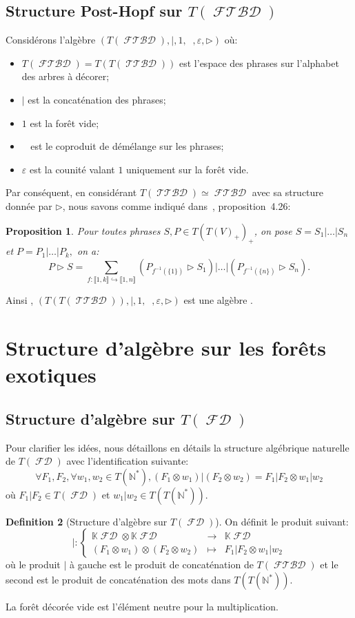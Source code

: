 \documentclass[french]{article}
\theoremstyle{definition}
\newtheorem{defi}{Definition}[section]
\theoremstyle{plain}
\newtheorem{Prop}[defi]{Proposition}
\newcommand{\IEM}[2]{\llbracket #1,#2 \rrbracket}
\newcommand{\e}{\varepsilon}
\newcommand{\K}{\mathbb{K}}
\newcommand{\N}{\mathbb{N}}
\DeclareMathOperator{\Dsh}{{\Delta_{\shuffle}}}
\DeclareMathOperator{\FTBD}{\mathcal{FTBD}}
\DeclareMathOperator{\TTBD}{\mathcal{TTBD}}
\DeclareMathOperator{\FD}{\mathcal{FD}}
\begin{document}
\subsection{Structure Post-Hopf sur $T(\FTBD)$}


Considérons l'algèbre \PH{} $\left( T(\FTBD), |, 1, \Dsh, \e, \rhd \right)$ où:
\begin{itemize}
	\item $T(\FTBD)=T(T(\TTBD))$ est l'espace des phrases sur l'alphabet des arbres à décorer;
	\item $|$ est la concaténation des phrases;
	\item $1$ est la forêt vide;
	\item $\Dsh$ est le coproduit de démélange sur les phrases;
	\item $\e$ est la counité valant $1$ uniquement sur la forêt vide.
\end{itemize}
Par conséquent, en considérant $T(\TTBD)\simeq\FTBD$ avec sa structure \PL{} donnée par $\rhd$, nous savons comme indiqué dans~\cite{Cat24CQMM}, proposition~4.26:

\begin{Prop}\label{Prop:PL_assoprod}
	Pour toutes phrases $S,P\in T\left(T(V)_+\right)_+$,  on pose $S=S_1|\dots|S_n$ et $P=P_1|\dots|P_k,$ on a:
	\[
	P\rhd S=\sum_{f:\IEM{1}{k}\hookrightarrow \IEM{1}{n}} \left(P_{f^{-1}(\{1\})}\rhd S_1\right)|\dots |\left( P_{f^{-1}(\{n\})}\rhd S_n\right).
	\]
\end{Prop}

Ainsi , $\left( T(T(\TTBD)), |, 1 , \Dsh, \e, \rhd \right)$ est une algèbre \PH{}.

\section{Structure d'algèbre \PH{} sur les forêts exotiques}

\subsection{Structure d'algèbre \PH{} sur $T(\FD)$}

Pour clarifier les idées, nous détaillons en détails la structure algébrique naturelle de $T(\FD)$ avec l'identification suivante:
\[
\forall F_1, F_2,\forall w_1,w_2\in T(\N^*), (F_1\otimes w_1)|(F_2\otimes w_2)=F_1|F_2\otimes w_1|w_2
\]
où $F_1|F_2\in T(\FD)$ et $w_1|w_2\in T(T(\N^*))$.

\begin{defi}[Structure d'algèbre sur $T(\FD)$]
	On définit le produit suivant:
	\[
	|:\left\lbrace\begin{array}{rcl}
		\K\FD\otimes \K\FD & \rightarrow & \K\FD \\
		(F_1\otimes w_1)\otimes (F_2\otimes w_2) & \mapsto & F_1| F_2 \otimes w_1 | w_2 
	\end{array} \right.
	\]
	où le produit $|$ à gauche est le produit de concaténation de $T(\FTBD)$ et le second est le produit de concaténation des mots dans $T(T(\N^*))$.
	
	La forêt décorée vide est l'élément neutre pour la multiplication.
\end{defi}
\end{document}
